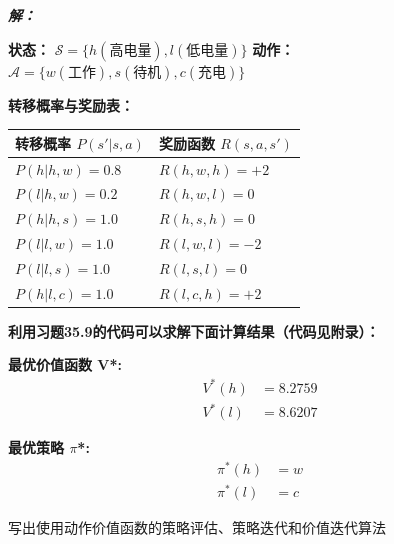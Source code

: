 \documentclass[12pt, a4paper]{article}
\newenvironment{solution}{
	\par\vspace{0.2cm}\noindent\textbf{\color{themecolor} \textit{解：}}
}{
	\par\vspace{0.5cm} %
}
\begin{document}
	\begin{solution}
		\textbf{状态：} $\mathcal{S} = \{h (\text{高电量}), l (\text{低电量})\}$
		\textbf{动作：} $\mathcal{A} = \{w (\text{工作}), s (\text{待机}), c (\text{充电})\}$
		
		\textbf{转移概率与奖励表：}
		\begin{table}[H] %
			\centering
			\begin{tabular}{ll}
				\toprule
				\textbf{转移概率} $P(s'|s,a)$ & \textbf{奖励函数} $R(s,a,s')$ \\
				\midrule
				$P(h|h,w) = 0.8$ & $R(h,w,h) = +2$ \\
				$P(l|h,w) = 0.2$ & $R(h,w,l) = 0$ \\
				$P(h|h,s) = 1.0$ & $R(h,s,h) = 0$ \\
				$P(l|l,w) = 1.0$ & $R(l,w,l) = -2$ \\
				$P(l|l,s) = 1.0$ & $R(l,s,l) = 0$ \\
				$P(h|l,c) = 1.0$ & $R(l,c,h) = +2$ \\
				\bottomrule
			\end{tabular}
		\end{table}
		
		\textbf{利用习题35.9的代码可以求解下面计算结果（代码见附录）：}
		
		\textbf{最优价值函数 V*:}
		\[
		\begin{aligned}
			V^*(h) &= 8.2759 \\
			V^*(l) &= 8.6207
		\end{aligned}
		\]
		
		\vspace{0.5cm}
		
		\textbf{最优策略 $\pi$*:}
		\[
		\begin{aligned}
			\pi^*(h) &= w \\
			\pi^*(l) &= c
		\end{aligned}
		\]
	\end{solution}
	
	\clearpage
	\begin{problem}[习题 35.11]
		写出使用动作价值函数的策略评估、策略迭代和价值迭代算法
	\end{problem}
	
\end{document}
